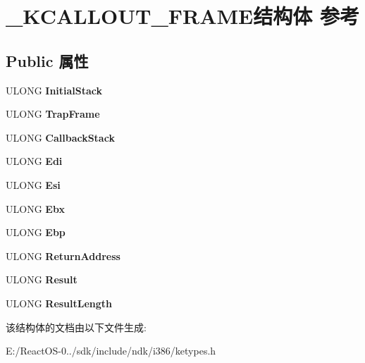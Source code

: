 \hypertarget{struct___k_c_a_l_l_o_u_t___f_r_a_m_e}{}\section{\+\_\+\+K\+C\+A\+L\+L\+O\+U\+T\+\_\+\+F\+R\+A\+M\+E结构体 参考}
\label{struct___k_c_a_l_l_o_u_t___f_r_a_m_e}
\subsection*{Public 属性}
\begin{DoxyCompactItemize}
\item 
\mbox{\label{struct___k_c_a_l_l_o_u_t___f_r_a_m_e_aecd7499dc71c9a96ee1a51cba52e2fe6}} 
U\+L\+O\+NG {\bfseries Initial\+Stack}
\item 
\mbox{\label{struct___k_c_a_l_l_o_u_t___f_r_a_m_e_ac1b31a98b91bfbfc6537638baacb6479}} 
U\+L\+O\+NG {\bfseries Trap\+Frame}
\item 
\mbox{\label{struct___k_c_a_l_l_o_u_t___f_r_a_m_e_a186451c200a27a423486008969ad41a5}} 
U\+L\+O\+NG {\bfseries Callback\+Stack}
\item 
\mbox{\label{struct___k_c_a_l_l_o_u_t___f_r_a_m_e_a0833ff94b47167fa9b3475bc3e585ff0}} 
U\+L\+O\+NG {\bfseries Edi}
\item 
\mbox{\label{struct___k_c_a_l_l_o_u_t___f_r_a_m_e_a0ecd31a0291cdf8fc4b5350238577de5}} 
U\+L\+O\+NG {\bfseries Esi}
\item 
\mbox{\label{struct___k_c_a_l_l_o_u_t___f_r_a_m_e_ace68972919eb6ba088fbb469a9009c35}} 
U\+L\+O\+NG {\bfseries Ebx}
\item 
\mbox{\label{struct___k_c_a_l_l_o_u_t___f_r_a_m_e_a3b04acd6ac952b6c8c9c715db3af212d}} 
U\+L\+O\+NG {\bfseries Ebp}
\item 
\mbox{\label{struct___k_c_a_l_l_o_u_t___f_r_a_m_e_ae25b8f29f15765c67199db2e7764a179}} 
U\+L\+O\+NG {\bfseries Return\+Address}
\item 
\mbox{\label{struct___k_c_a_l_l_o_u_t___f_r_a_m_e_ada26621cce984441c8db205419cd3118}} 
U\+L\+O\+NG {\bfseries Result}
\item 
\mbox{\label{struct___k_c_a_l_l_o_u_t___f_r_a_m_e_a876d338f38d1eb4969c6366da64d2a6f}} 
U\+L\+O\+NG {\bfseries Result\+Length}
\end{DoxyCompactItemize}


该结构体的文档由以下文件生成\+:\begin{DoxyCompactItemize}
\item 
E\+:/\+React\+O\+S-\/0../sdk/include/ndk/i386/ketypes.\+h\end{DoxyCompactItemize}
